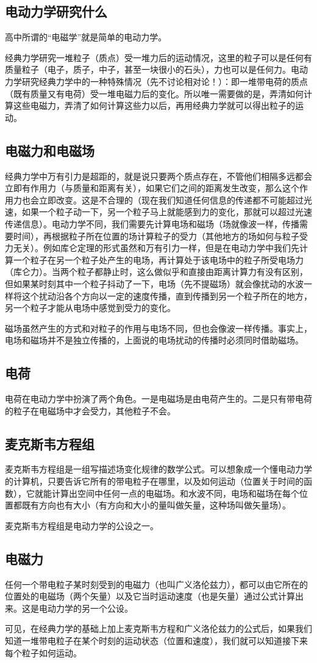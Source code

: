 \subsection{电动力学研究什么}

高中所谓的“电磁学”就是简单的电动力学。

经典力学研究一堆粒子（质点）受一堆力后的运动情况，这里的粒子可以是任何有质量粒子（电子，质子，中子，甚至一块很小的石头），力也可以是任何力。电动力学研究经典力学中的一种特殊情况（先不讨论相对论！）：即一堆带电荷的质点（既有质量又有电荷）受一堆电磁力后的变化。所以唯一需要做的是，弄清如何计算这些电磁力，弄清了如何计算这些力以后，再用经典力学就可以得出粒子的运动。

\subsection{电磁力和电磁场}
经典力学中万有引力是超距的，就是说只要两个质点存在，不管他们相隔多远都会立即有作用力（与质量和距离有关），如果它们之间的距离发生改变，那么这个作用力也会立即改变。这是不合理的（现在我们知道任何信息的传递都不可能超过光速，如果一个粒子动一下，另一个粒子马上就能感到力的变化，那就可以超过光速传递信息）。电动力学不同，我们需要先计算电场和磁场（场就像波一样，传播需要时间），再根据粒子所在位置的场计算粒子的受力（其他地方的场如何与粒子受力无关）。例如库仑定理的形式虽然和万有引力一样，但是在电动力学中我们先计算一个粒子在另一个粒子处产生的电场，再计算处于该电场中的粒子所受电场力（库仑力）。当两个粒子都静止时，这么做似乎和直接由距离计算力有没有区别，但如果某时刻其中一个粒子抖动了一下，电场（先不提磁场）就会像扰动的水波一样将这个扰动沿各个方向以一定的速度传播，直到传播到另一个粒子所在的地方，另一个粒子才能从电场中感觉到受力的变化。

磁场虽然产生的方式和对粒子的作用与电场不同，但也会像波一样传播。事实上，电场和磁场并不是独立传播的，上面说的电场扰动的传播时必须同时借助磁场。

\subsection{电荷}
电荷在电动力学中扮演了两个角色。一是电磁场是由电荷产生的。二是只有带电荷的粒子在电磁场中才会受力，其他粒子不会。

\subsection{麦克斯韦方程组}
麦克斯韦方程组是一组写描述场变化规律的数学公式。可以想象成一个懂电动力学的计算机，只要告诉它所有的带电粒子在哪里，以及如何运动（位置关于时间的函数），它就能计算出空间中任何一点的电磁场。和水波不同，电场和磁场在每个位置都既有方向也有大小（有方向和大小的量叫做矢量，这种场叫做矢量场）。

麦克斯韦方程组是电动力学的公设之一。

\subsection{电磁力}
任何一个带电粒子某时刻受到的电磁力（也叫广义洛伦兹力），都可以由它所在的位置处的电磁场（两个矢量）以及它当时运动速度（也是矢量）通过公式计算出来。这是电动力学的另一个公设。

可见，在经典力学的基础上加上麦克斯韦方程和广义洛伦兹力的公式后，如果我们知道一堆带电粒子在某个时刻的运动状态（位置和速度），我们就可以知道接下来每个粒子如何运动。
